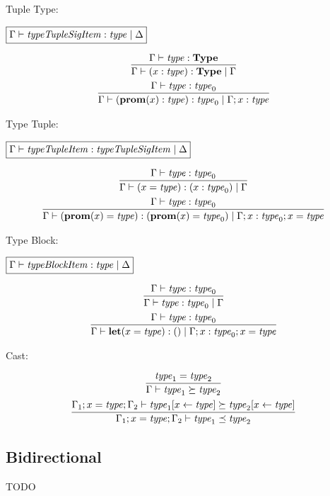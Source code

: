 Tuple Type:

$\fbox{$\Gamma \vdash \mathit{typeTupleSigItem}: \mathit{type} \mid \Delta$}$

\begin{gather*}
  \infer{\Gamma \vdash (x: \mathit{type}): \mathbf{Type} \mid \Gamma}{
    \Gamma \vdash \mathit{type}: \mathbf{Type}
  }
  \\
  \infer{\Gamma \vdash (\mathbf{prom}(x): \mathit{type}): \mathit{type}_0 \mid \Gamma; x: \mathit{type}}{
    \Gamma \vdash \mathit{type}: \mathit{type}_0
  }
\end{gather*}

Type Tuple:

$\fbox{$\Gamma \vdash \mathit{typeTupleItem}: \mathit{typeTupleSigItem} \mid \Delta$}$

\begin{gather*}
  \infer{\Gamma \vdash (x = \mathit{type}): (x: \mathit{type}_0) \mid \Gamma}{
    \Gamma \vdash \mathit{type}: \mathit{type}_0
  }
  \\
  \infer{\Gamma \vdash (\mathbf{prom}(x) = \mathit{type}): (\mathbf{prom}(x) = \mathit{type}_0) \mid \Gamma; x: \mathit{type}_0; x = \mathit{type}}{
    \Gamma \vdash \mathit{type}: \mathit{type}_0
  }
\end{gather*}

Type Block:

$\fbox{$\Gamma \vdash \mathit{typeBlockItem}: \mathit{type} \mid \Delta$}$

\begin{gather*}
  \infer{\Gamma \vdash \mathit{type}: \mathit{type}_0 \mid \Gamma}{
    \Gamma \vdash \mathit{type}: \mathit{type}_0
  }
  \\
  \infer{\Gamma \vdash \mathbf{let}(x = \mathit{type}): () \mid \Gamma; x: \mathit{type}_0; x = \mathit{type}}{
    \Gamma \vdash \mathit{type}: \mathit{type}_0
  }
\end{gather*}

Cast:

\begin{gather*}
  \infer{\Gamma \vdash \mathit{type}_1 \succeq \mathit{type}_2}{
    \mathit{type}_1 = \mathit{type}_2
  }
  \\
  \infer{\Gamma_1; x = \mathit{type}; \Gamma_2 \vdash \mathit{type}_1 \preceq \mathit{type}_2}{
    \Gamma_1; x = \mathit{type}; \Gamma_2 \vdash \mathit{type}_1[x \assign \mathit{type}] \succeq \mathit{type}_2[x \assign \mathit{type}]
  }
\end{gather*}

\subsection{Bidirectional}

TODO
